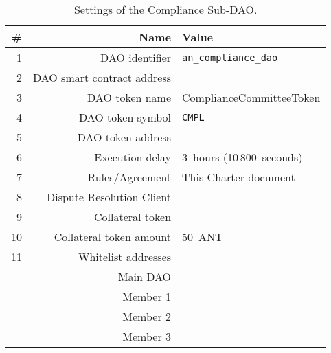 \begin{table}[h!]
	\caption{Settings of the Compliance Sub-DAO.}
	\centering
	\begin{tabular}{rrl}
		\toprule
		\# & Name & Value \\
		\midrule
		1 & \ac{DAO} identifier & \texttt{an\_compliance\_dao}\\
		2 & \ac{DAO} smart contract address & \cmplSubDaoAddr\\
		3 & \ac{DAO} token name & ComplianceCommitteeToken\\
		4 & \ac{DAO} token symbol & \texttt{CMPL}\\
		5 & \ac{DAO} token address & \cmplSubDaoTokenAddr\\
		6 & Execution delay & 3~hours (10\,800~seconds)\\
		7 & Rules/Agreement & This Charter document\\
		8 & Dispute Resolution Client & \aragonCourtAddr\\
		9 & Collateral token & \antTokenAddr\\
		10 & Collateral token amount & 50~\ac{ANT}\\
		11 & Whitelist addresses \\
		& Main \ac{DAO} & \mainDaoAddr\\
		& Member 1 & \cmplSubDaoMemberAddrI\\
		& Member 2 & \cmplSubDaoMemberAddrII\\
		& Member 3 & \cmplSubDaoMemberAddrIII\\
		\bottomrule
	\end{tabular}
\end{table}

